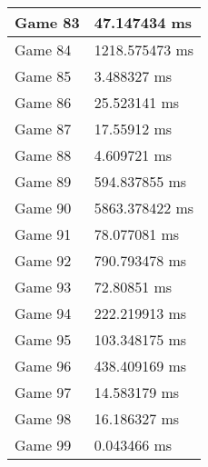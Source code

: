 \begin{tabular}{|l|l|}
	Game 83 & 47.147434 ms \\ \hline
	Game 84 & 1218.575473 ms \\ \hline
	Game 85 & 3.488327 ms \\ \hline
	Game 86 & 25.523141 ms \\ \hline
	Game 87 & 17.55912 ms \\ \hline
	Game 88 & 4.609721 ms \\ \hline
	Game 89 & 594.837855 ms \\ \hline
	Game 90 & 5863.378422 ms \\ \hline
	Game 91 & 78.077081 ms \\ \hline
	Game 92 & 790.793478 ms \\ \hline
	Game 93 & 72.80851 ms \\ \hline
	Game 94 & 222.219913 ms \\ \hline
	Game 95 & 103.348175 ms \\ \hline
	Game 96 & 438.409169 ms \\ \hline
	Game 97 & 14.583179 ms \\ \hline
	Game 98 & 16.186327 ms \\ \hline
	Game 99 & 0.043466 ms \\ \hline
\end{tabular}
